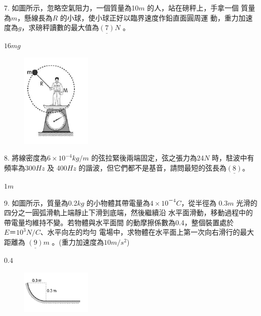 \documentclass[cn,10pt,math=newtx]{elegantbook}
\begin{document}
\begin{example}
   7. 如圖所示，忽略空氣阻力，一個質量為10$m$ 的人，站在磅秤上，手拿一個
質量為$m$，懸線長為$R$ 的小球，使小球正好以臨界速度作鉛直面圓周運
動，重力加速度為$g$，求磅秤讀數的最大值為$\underline{(7)} N$ 。
\\
    \rightline{[全國聯招教甄109]}
\end{example}
\begin{solution}
    $16mg$
\end{solution}
\begin{figure}[htbp]
    \flushright
    \includegraphics[width=0.3\textwidth]{image/109全國27.png}
  \end{figure}
\newpage


\begin{example}
   8. 將線密度為$6\times10^{-4} kg/m$ 的弦拉緊後兩端固定，弦之張力為24$N$ 時，駐波中有頻率為300$Hz$ 及
400$Hz$ 的諧波，但它們都不是基音，請問最短的弦長為$\underline{(8)}$。\\
    \rightline{[全國聯招教甄109]}
\end{example}
\begin{solution}
    $1m$
\end{solution}

\newpage


\begin{example}
   9. 如圖所示，質量為0.2$kg$ 的小物體其帶電量為$4\times10^{－4} C$，從半徑為
0.3$m$ 光滑的四分之一圓弧滑軌上端靜止下滑到底端，然後繼續沿
水平面滑動，移動過程中的帶電量均維持不變。若物體與水平面間
的動摩擦係數為0.4，整個裝置處於$E＝10^3 N/C$、水平向左的均勻
電場中，求物體在水平面上第一次向右滑行的最大距離為
$\underline{(9)}  m$ 。(重力加速度為$10 m/s^2$)\\
    \rightline{[全國聯招教甄109]}
\end{example}
\begin{solution}
    $0.4$
\end{solution}
\begin{figure}[htbp]
    \flushright
    \includegraphics[width=0.3\textwidth]{image/109全國29.png}
  \end{figure}
\newpage
\end{document}

